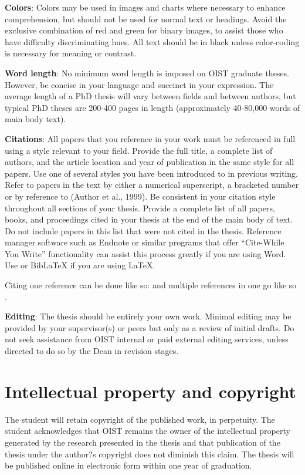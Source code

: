 \textbf{Colors}:  Colors may be used in images and charts where necessary to enhance comprehension, but should not be used for normal text or headings.  Avoid the exclusive combination of red and green for binary images, to assist those who have difficulty discriminating hues.  All text should be in black unless color-coding is necessary for meaning or contrast.

\textbf{Word length}:  No minimum word length is imposed on OIST graduate theses.  However, be concise in your language and succinct in your expression.  The average length of a PhD thesis will vary between fields and between authors, but typical PhD theses are 200-400 pages in length (approximately 40-80,000 words of main body text).  

\textbf{Citations}:  All papers that you reference in your work must be referenced in full using a style relevant to your field. Provide the full title, a complete list of authors, and the article location and year of publication in the same style for all papers. Use one of several styles you have been introduced to in previous writing.  Refer to papers in the text by either a numerical superscript, a bracketed number or by reference to (Author et al., 1999).  Be consistent in your citation style throughout all sections of your thesis.  Provide a complete list of all papers, books, and proceedings cited in your thesis at the end of the main body of text.  Do not include papers in this list that were not cited in the thesis.  Reference manager software such as Endnote or similar programs that offer ``Cite-While You Write'' functionality can assist this process greatly if you are using Word. Use  or BibLaTeX if you are using LaTeX.

Citing one reference can be done like so: \cite{Lee98} and multiple references in one go like so \cite{Fil09, Muc10, Kra27}.

\textbf{Editing}:  The thesis should be entirely your own work. Minimal editing may be provided by your supervisor(s) or peers but only as a review of initial drafts.  Do not seek assistance from OIST internal or paid external editing services, unless directed to do so by the Dean in revision stages.

\section{Intellectual property and copyright}

The student will retain copyright of the published work, in perpetuity.  The student acknowledges that OIST remains the owner of the intellectual property generated by the research presented in the thesis and that publication of the thesis under the author?s copyright does not diminish this claim.  The thesis will be published online in electronic form within one year of graduation.


